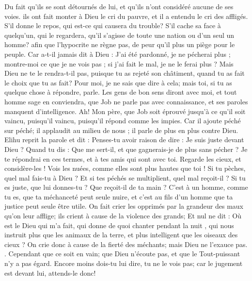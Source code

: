 \begin{multicols}{2}
Du fait qu'ils se sont détournés de lui, et qu'ils n'ont considéré aucune de ses voies.
ils ont fait monter à Dieu le cri du pauvre, et il a entendu le cri des affligés.
S'il donne le repos, qui est-ce qui causera du trouble? S'il cache sa face à quelqu'un, qui le regardera, qu'il s'agisse de toute une nation ou d'un seul un homme?
afin que l'hypocrite ne règne pas, de peur qu'il plus un piège pour le peuple.
Car a-t-il jamais dit à Dieu : J'ai été pardonné, je ne pécherai plus ;
montre-moi ce que je ne vois pas ; si j'ai fait le mal, je ne le ferai plus ?
Mais Dieu ne te le rendra-t-il pas, puisque tu as rejeté son châtiment, quand tu as fait le choix que tu as fait? Pour moi, je ne sais que dire à cela; mais toi, si tu as quelque chose à répondre, parle.
Les gens de bon sens diront avec moi, et tout homme sage en conviendra,
que Job ne parle pas avec connaissance, et ses paroles manquent d'intelligence.
Ah! Mon père, que Job soit éprouvé jusqu'à ce qu'il soit vaincu, puisqu'il vaincu, puisqu'il répond comme les impies.
Car il ajoute péché sur péché; il applaudit au milieu de nous ; il parle de plus en plus contre Dieu.
\VerseOne{}Elihu reprit la parole et dit :
Penses-tu avoir raison de dire : Je suis juste devant Dieu ?
Quand tu dis : Que me sert-il, et que gagnerais-je de plus sans pécher ?
Je te répondrai en ces termes, et à tes amis qui sont avec toi.
Regarde les cieux, et considère-les ! Vois les nuées, comme elles sont plus hautes que toi !
Si tu pèches, quel mal fais-tu à Dieu ? Et si tes péchés se multiplient, quel mal reçoit-il ?
Si tu es juste, que lui donnes-tu ? Que reçoit-il de ta main ?
C'est à un homme, comme tu es, que ta méchanceté peut seule nuire, et c'est au fils d'un homme que ta justice peut seule être utile.
On fait crier les opprimés par la grandeur des maux qu'on leur afflige; ils crient à cause de la violence des grands;
Et nul ne dit : Où est le Dieu qui m'a fait, qui donne de quoi chanter pendant la nuit ,
qui nous instruit plus que les animaux de la terre, et plus intelligent que les oiseaux des cieux ?
On crie donc à cause de la fierté des méchants; mais Dieu ne l'exauce pas.
.
 Cependant que ce soit en vain; que Dieu n'écoute pas, et que le Tout-puissant n'y a pas égard.
Encore moins dois-tu lui dire, tu ne le vois pas; car le jugement est devant lui, attends-le donc!

\end{multicols}
